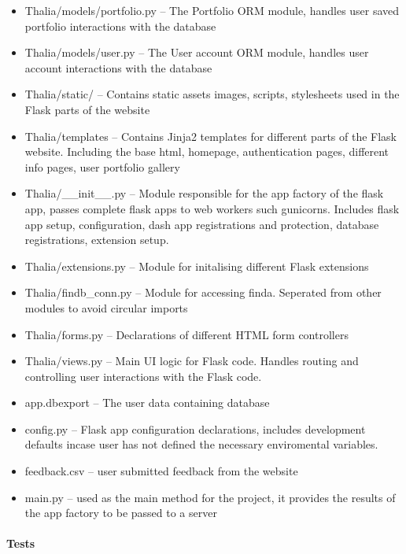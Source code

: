\documentclass[main.tex]{subfiles}
\begin{document}
\begin{itemize}

\item
  Thalia/models/portfolio.py -- The Portfolio ORM module, handles user
  saved portfolio interactions with the database
\item
  Thalia/models/user.py -- The User account ORM module, handles user
  account interactions with the database
\item
  Thalia/static/ -- Contains static assets images, scripts, stylesheets
  used in the Flask parts of the website
\item
  Thalia/templates -- Contains Jinja2 templates for different parts of
  the Flask website. Including the base html, homepage, authentication
  pages, different info pages, user portfolio gallery
\item
  Thalia/\_\_init\_\_.py -- Module responsible for the app factory of
  the flask app, passes complete flask apps to web workers such
  gunicorns. Includes flask app setup, configuration, dash app
  registrations and protection, database registrations, extension setup.
\item
  Thalia/extensions.py -- Module for initalising different Flask
  extensions
\item
  Thalia/findb\_conn.py -- Module for accessing finda. Seperated from
  other modules to avoid circular imports
\item
  Thalia/forms.py -- Declarations of different HTML form controllers
\item
  Thalia/views.py -- Main UI logic for Flask code. Handles routing and
  controlling user interactions with the Flask code.
\item
  app.dbexport -- The user data containing database
\item
  config.py -- Flask app configuration declarations, includes
  development defaults incase user has not defined the necessary
  enviromental variables.
\item
  feedback.csv -- user submitted feedback from the website
\item
  main.py -- used as the main method for the project, it provides the
  results of the app factory to be passed to a server
\end{itemize}

\paragraph{Tests}\label{tests-4}
\end{document}
